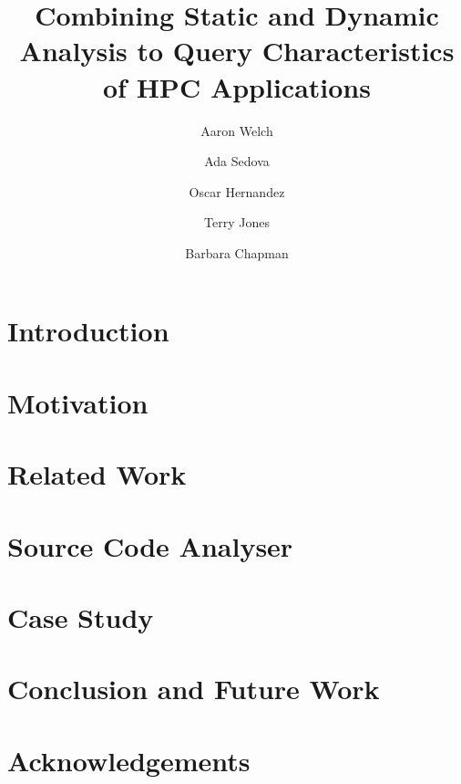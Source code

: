 \documentclass[conference]{IEEEtran}
\begin{document}
\title{\LARGE \bf
Combining Static and Dynamic Analysis to Query Characteristics of \acs{HPC} Applications
}
\author[1, 2]{Aaron Welch}
\author[1]{Ada Sedova}
\author[1]{Oscar Hernandez}
\author[1]{Terry Jones}
\author[3]{Barbara Chapman}

\maketitle
\begin{abstract}

\end{abstract}
\section{Introduction}
\label{sec:intro}

\section{Motivation}
\label{sec:motivation}

\section{Related Work}
\label{sec:related}

\section{Source Code Analyser}
\label{sec:analysis}

\section{Case Study}
\label{sec:casestudy}

\section{Conclusion and Future Work}
\label{sec:conclusion}

\section*{Acknowledgements}
\label{sec:ack}



\end{document}
